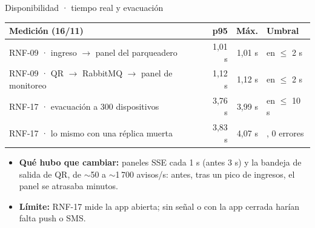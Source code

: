 \begin{frame}{Disponibilidad · tiempo real y evacuación}
\small
\begin{tabular}{@{}L{5.6cm}rrL{3.6cm}@{}}
\toprule
\textbf{Medición (16/11)} & \textbf{p95} & \textbf{Máx.} & \textbf{Umbral}\\
\midrule
RNF-09 · ingreso $\rightarrow$ panel del parqueadero & 1,01 s & 1,01 s & \leavevmode{} en $\leq$ 2 s\\
RNF-09 · QR $\rightarrow$ RabbitMQ $\rightarrow$ panel de monitoreo & 1,12 s & 1,12 s & \leavevmode{} en $\leq$ 2 s\\
RNF-17 · evacuación a 300 dispositivos & 3,76 s & 3,99 s & \leavevmode{} en $\leq$ 10 s\\
RNF-17 · lo mismo con una réplica muerta & 3,83 s & 4,07 s & \leavevmode{}, 0 errores\\
\bottomrule
\end{tabular}

\vspace{0.6em}
\footnotesize
\begin{itemize}\setlength\itemsep{0.2em}
\item \textbf{Qué hubo que cambiar:} paneles SSE cada 1 s (antes 3 s) y la bandeja de salida de QR,
de $\sim$50 a $\sim$1\,700 avisos/s: antes, tras un pico de ingresos, el panel se atrasaba minutos.
\item \textbf{Límite:} RNF-17 mide la app abierta; sin señal o con la app cerrada harían falta push o SMS.
\end{itemize}
\end{frame}
\fi

